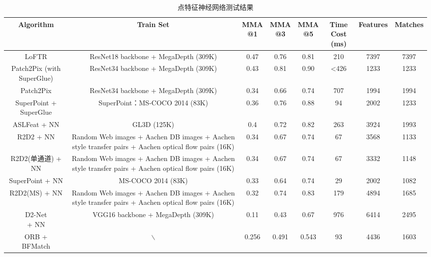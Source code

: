\begin{table}[!ht]
  \centering
  \begin{tabular}{|c|c|c|c|c|c|c|c|}
  \hline
      Algorithm & Train Set & \makecell{MMA\\@1} & \makecell{MMA\\@3} & \makecell{MMA\\@5} & \makecell{Time Cost\\(ms)} & Features & Matches \\ \hline
      \parbox[c][9ex]{2cm}{LoFTR} &  \parbox[c][9ex]{3.5cm}{ResNet18 backbone + MegaDepth (309K)} & 0.47 & 0.76 & 0.81 & 210 & 7397 & 7397 \\ \hline
      \parbox[c][13ex]{2cm}{Patch2Pix (with SuperGlue)} & \parbox[c][9ex]{3.5cm}{ResNet34 backbone + MegaDepth (309K)} & 0.43 & 0.81 & 0.90 & <426 & 1233 & 1233 \\ \hline
      \parbox[c][9ex]{2cm}{Patch2Pix} & \parbox[c][9ex]{3.5cm}{ResNet34 backbone + MegaDepth (309K)} & 0.34 & 0.66 & 0.74 & 707 & 1994 & 1994 \\ \hline
      \parbox[c][9ex]{2cm}{SuperPoint + SuperGlue} & \parbox[c][9ex]{3.5cm}{SuperPoint：MS-COCO 2014 (83K)} & 0.36 & 0.76 & 0.88 & 94 & 2002 & 1233 \\ \hline
      \parbox[c][9ex]{2cm}{ASLFeat + NN} & \parbox[c][9ex]{3.5cm}{GL3D (125K)} & 0.4 & 0.72 & 0.82 & 263 & 3924 & 1993 \\ \hline
      \parbox[c][9ex]{2cm}{R2D2 + NN} & \parbox[c][17ex]{3.5cm}{Random Web images + Aachen DB images + Aachen style transfer pairs + Aachen optical flow pairs (16K)} & 0.34 & 0.67 & 0.74 & 67 & 3568 & 1133 \\ \hline
      \parbox[c][9ex]{2cm}{R2D2(单通道) + NN} & \parbox[c][17ex]{3.5cm}{Random Web images + Aachen DB images + Aachen style transfer pairs + Aachen optical flow pairs (16K)} & 0.34 & 0.67 & 0.74 & 67 & 3332 & 1148 \\ \hline
      \parbox[c][9ex]{2cm}{SuperPoint + NN} & \parbox[c][9ex]{3.5cm}{MS-COCO 2014 (83K)} & 0.33 & 0.64 & 0.74 & 29 & 2002 & 1082 \\ \hline
      \parbox[c][9ex]{2cm}{R2D2(MS) + NN} & \parbox[c][17ex]{3.5cm}{Random Web images + Aachen DB images + Aachen style transfer pairs + Aachen optical flow pairs (16K)} & 0.32 & 0.74 & 0.83 & 179 & 4894 & 1685 \\ \hline
      \parbox[c][9ex]{2cm}{D2-Net\\+ NN} &  \parbox[c][9ex]{3.5cm}{VGG16 backbone + MegaDepth (309K)} & 0.11 & 0.43 & 0.67 & 976 & 6414 & 2495 \\ \hline
      \parbox[c][9ex]{2cm}{ORB +\\ BFMatch} & $\backslash$ & 0.256 & 0.491 & 0.543 & 93 & 4436 & 1603 \\ \hline
  \end{tabular}
  \caption{点特征神经网络测试结果}
  \label{tab_PLtest}
\end{table}

